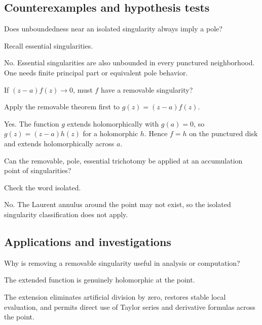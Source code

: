 \subsection*{Counterexamples and hypothesis tests}

\begin{exercise}\label{exr:iv09-expand-10}
Does unboundedness near an isolated singularity always imply a pole?
\end{exercise}
\begin{hint}
Recall essential singularities.
\end{hint}
\begin{solution}
No. Essential singularities are also unbounded in every punctured neighborhood. One needs finite principal part or equivalent pole behavior.
\end{solution}

\begin{exercise}\label{exr:iv09-expand-11}
If \((z-a)f(z)\to0\), must \(f\) have a removable singularity?
\end{exercise}
\begin{hint}
Apply the removable theorem first to \(g(z)=(z-a)f(z)\).
\end{hint}
\begin{solution}
Yes. The function \(g\) extends holomorphically with \(g(a)=0\), so \(g(z)=(z-a)h(z)\) for a holomorphic \(h\). Hence \(f=h\) on the punctured disk and extends holomorphically across \(a\).
\end{solution}

\begin{exercise}\label{exr:iv09-expand-12}
Can the removable, pole, essential trichotomy be applied at an accumulation point of singularities?
\end{exercise}
\begin{hint}
Check the word isolated.
\end{hint}
\begin{solution}
No. The Laurent annulus around the point may not exist, so the isolated singularity classification does not apply.
\end{solution}

\subsection*{Applications and investigations}

\begin{exercise}\label{exr:iv09-expand-13}
Why is removing a removable singularity useful in analysis or computation?
\end{exercise}
\begin{hint}
The extended function is genuinely holomorphic at the point.
\end{hint}
\begin{solution}
The extension eliminates artificial division by zero, restores stable local evaluation, and permits direct use of Taylor series and derivative formulas across the point.
\end{solution}

